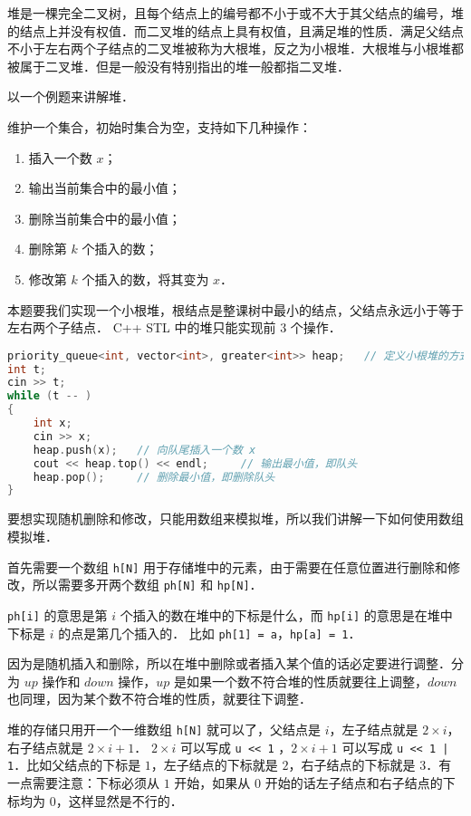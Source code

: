 
堆是一棵完全二叉树，且每个结点上的编号都不小于或不大于其父结点的编号，堆的结点上并没有权值．而二叉堆的结点上具有权值，且满足堆的性质．满足父结点不小于左右两个子结点的二叉堆被称为大根堆，反之为小根堆．大根堆与小根堆都被属于二叉堆．但是一般没有特别指出的堆一般都指二叉堆．

以一个例题来讲解堆．

维护一个集合，初始时集合为空，支持如下几种操作：
\begin{enumerate}
\item 插入一个数 $x$；
\item 输出当前集合中的最小值；
\item 删除当前集合中的最小值；
\item 删除第 $k$ 个插入的数；
\item 修改第 $k$ 个插入的数，将其变为 $x$．
\end{enumerate}

本题要我们实现一个小根堆，根结点是整课树中最小的结点，父结点永远小于等于左右两个子结点．
C++ STL 中的堆只能实现前 $3$ 个操作．
\begin{lstlisting}[language=cpp]
priority_queue<int, vector<int>, greater<int>> heap;   // 定义小根堆的方式
int t;
cin >> t;
while (t -- )
{
    int x;            
    cin >> x;
    heap.push(x);   // 向队尾插入一个数 x
    cout << heap.top() << endl;     // 输出最小值，即队头
    heap.pop();     // 删除最小值，即删除队头
}
\end{lstlisting}

要想实现随机删除和修改，只能用数组来模拟堆，所以我们讲解一下如何使用数组模拟堆．

首先需要一个数组 \verb|h[N]| 用于存储堆中的元素，由于需要在任意位置进行删除和修改，所以需要多开两个数组 \verb|ph[N]| 和 \verb|hp[N]|．

\verb|ph[i]| 的意思是第 $i$ 个插入的数在堆中的下标是什么，而 \verb|hp[i]| 的意思是在堆中下标是 $i$ 的点是第几个插入的．
比如 \verb|ph[1] = a|，\verb|hp[a] = 1|．

因为是随机插入和删除，所以在堆中删除或者插入某个值的话必定要进行调整．分为 $up$ 操作和 $down$ 操作，$up$ 是如果一个数不符合堆的性质就要往上调整，$down$ 也同理，因为某个数不符合堆的性质，就要往下调整．

堆的存储只用开一个一维数组 \verb|h[N]| 就可以了，父结点是 $i$，左子结点就是 $2 \times i$，右子结点就是 $2 \times i + 1$．
$2 \times i$ 可以写成 \verb|u << 1| ，$2 \times i + 1$ 可以写成 \verb?u << 1 | 1?．比如父结点的下标是 $1$，左子结点的下标就是 $2$，右子结点的下标就是 $3$．有一点需要注意：下标必须从 $1$ 开始，如果从 $0$ 开始的话左子结点和右子结点的下标均为 $0$，这样显然是不行的．

